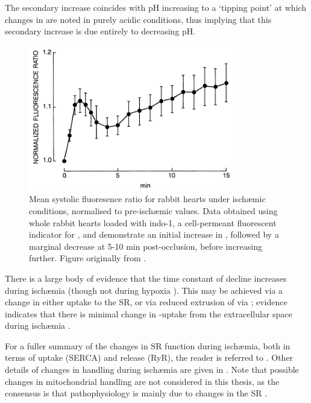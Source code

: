 \documentclass[../thesis-main.tex]{subfiles}
\begin{document}
The secondary increase coincides with pH increasing to a `tipping point' at which changes in \cai{} are noted in purely acidic conditions, thus implying that this secondary increase is due entirely to decreasing pH.
\begin{figure}
 \centering
 \includegraphics[width=0.8\textwidth]{ca-ischaemia}
 \caption[Effect of isch\ae{}mia on \cai{}.]{Mean systolic fluoresence ratio for rabbit hearts under isch\ae{}mic conditions, normalised to pre-isch\ae{}mic values. Data obtained using whole rabbit hearts loaded with indo-1, a cell-permeant fluorescent indicator for \ca{}, and demonstrate an initial increase in \cai{}, followed by a marginal decrease at 5-10 min post-occlusion, before increasing further. Figure originally from \citet{Mohabir1991}.}
 \label{fig:ca-ischaemia}
\end{figure}

There is a large body of evidence that the time constant of \cadia{} decline increases during isch\ae{}mia \citep{Allen1983, Camacho1994, Lee1988} (though not during hypoxia \citep{Silverman1991}). This may be achieved via a change in either \ca{} uptake to the SR, or via reduced extrusion of \ca{} via \inaca{}; evidence indicates that there is minimal change in \ca{}-uptake from the extracellular space during isch\ae{}mia \citep{Bourdillon1982}.

For a fuller summary of the changes in SR function during isch\ae{}mia, both in terms of uptake (SERCA) and release (RyR), the reader is referred to \citet{Mubagwa1995}. Other details of changes in \ca{} handling during isch\ae{}mia are given in \citet{Talukder2009}. Note that possible changes in mitochondrial \ca{} handling are not considered in this thesis, as the consensus is that \ca{} pathophysiology is mainly due to changes in the SR \citep{Fauconnier2013}.
\end{document}
